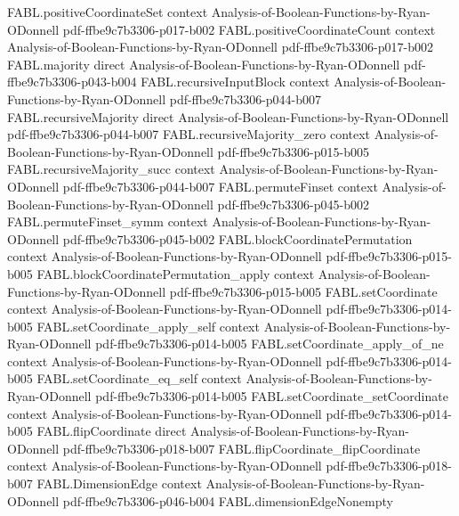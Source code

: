 \begin{theorem}
\proofstep
  {FABL.positiveCoordinateSet}
  {context}
  {Analysis-of-Boolean-Functions-by-Ryan-ODonnell}
  {pdf-ffbe9c7b3306-p017-b002}
\proofstep
  {FABL.positiveCoordinateCount}
  {context}
  {Analysis-of-Boolean-Functions-by-Ryan-ODonnell}
  {pdf-ffbe9c7b3306-p017-b002}
\proofstep
  {FABL.majority}
  {direct}
  {Analysis-of-Boolean-Functions-by-Ryan-ODonnell}
  {pdf-ffbe9c7b3306-p043-b004}
\proofstep
  {FABL.recursiveInputBlock}
  {context}
  {Analysis-of-Boolean-Functions-by-Ryan-ODonnell}
  {pdf-ffbe9c7b3306-p044-b007}
\proofstep
  {FABL.recursiveMajority}
  {direct}
  {Analysis-of-Boolean-Functions-by-Ryan-ODonnell}
  {pdf-ffbe9c7b3306-p044-b007}
\proofstep
  {FABL.recursiveMajority_zero}
  {context}
  {Analysis-of-Boolean-Functions-by-Ryan-ODonnell}
  {pdf-ffbe9c7b3306-p015-b005}
\proofstep
  {FABL.recursiveMajority_succ}
  {context}
  {Analysis-of-Boolean-Functions-by-Ryan-ODonnell}
  {pdf-ffbe9c7b3306-p044-b007}
\proofstep
  {FABL.permuteFinset}
  {context}
  {Analysis-of-Boolean-Functions-by-Ryan-ODonnell}
  {pdf-ffbe9c7b3306-p045-b002}
\proofstep
  {FABL.permuteFinset_symm}
  {context}
  {Analysis-of-Boolean-Functions-by-Ryan-ODonnell}
  {pdf-ffbe9c7b3306-p045-b002}
\proofstep
  {FABL.blockCoordinatePermutation}
  {context}
  {Analysis-of-Boolean-Functions-by-Ryan-ODonnell}
  {pdf-ffbe9c7b3306-p015-b005}
\proofstep
  {FABL.blockCoordinatePermutation_apply}
  {context}
  {Analysis-of-Boolean-Functions-by-Ryan-ODonnell}
  {pdf-ffbe9c7b3306-p015-b005}
\proofstep
  {FABL.setCoordinate}
  {context}
  {Analysis-of-Boolean-Functions-by-Ryan-ODonnell}
  {pdf-ffbe9c7b3306-p014-b005}
\proofstep
  {FABL.setCoordinate_apply_self}
  {context}
  {Analysis-of-Boolean-Functions-by-Ryan-ODonnell}
  {pdf-ffbe9c7b3306-p014-b005}
\proofstep
  {FABL.setCoordinate_apply_of_ne}
  {context}
  {Analysis-of-Boolean-Functions-by-Ryan-ODonnell}
  {pdf-ffbe9c7b3306-p014-b005}
\proofstep
  {FABL.setCoordinate_eq_self}
  {context}
  {Analysis-of-Boolean-Functions-by-Ryan-ODonnell}
  {pdf-ffbe9c7b3306-p014-b005}
\proofstep
  {FABL.setCoordinate_setCoordinate}
  {context}
  {Analysis-of-Boolean-Functions-by-Ryan-ODonnell}
  {pdf-ffbe9c7b3306-p014-b005}
\proofstep
  {FABL.flipCoordinate}
  {direct}
  {Analysis-of-Boolean-Functions-by-Ryan-ODonnell}
  {pdf-ffbe9c7b3306-p018-b007}
\proofstep
  {FABL.flipCoordinate_flipCoordinate}
  {context}
  {Analysis-of-Boolean-Functions-by-Ryan-ODonnell}
  {pdf-ffbe9c7b3306-p018-b007}
\proofstep
  {FABL.DimensionEdge}
  {context}
  {Analysis-of-Boolean-Functions-by-Ryan-ODonnell}
  {pdf-ffbe9c7b3306-p046-b004}
\proofstep
  {FABL.dimensionEdgeNonempty}

\end{theorem}
